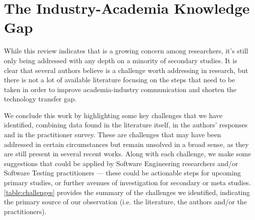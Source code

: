 \chapter{The Industry-Academia Knowledge Gap}\label{chap:gap}

While this review indicates that \rea is a growing concern among \rt researchers, it's still only being addressed with any depth on a minority of secondary studies.
It is clear that several authors believe \rea is a challenge worth addressing in research, but there is not a lot of available \rt literature focusing on the steps that need to be taken in order to improve academia-industry communication and shorten the technology transfer gap.

We conclude this work by highlighting some key challenges that we have identified, combining data found in the literature itself, in the authors' responses and in the practitioner survey.
These are challenges that may have been addressed in certain circumstances but remain unsolved in a broad sense, as they are still present in several recent works.
Along with each challenge, we make some suggestions that could be applied by Software Engineering researchers and/or Software Testing practitioners — these could be actionable steps for upcoming primary studies, or further avenues of investigation for secondary or meta studies.
\autoref{table:challenges} provides the summary of the challenges we identified, indicating the primary source of our observation (i.e. the literature, the authors and/or the practitioners).

